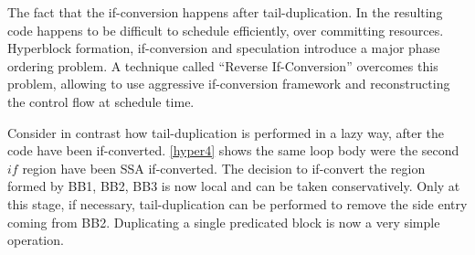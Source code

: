 \begin{figure}[h]
{    \label{fig:hyper2}}
\end{figure}
The fact that the if-conversion happens after tail-duplication. In the resulting code happens to be difficult to schedule efficiently, over committing resources. Hyperblock formation, if-conversion and speculation introduce a major phase ordering problem. A technique called ``Reverse If-Conversion'' \cite{August:1999:PRI:326224.325595} overcomes this problem, allowing to use aggressive if-conversion framework and reconstructing the control flow at schedule time.

Consider in contrast how tail-duplication is performed in a lazy way, after the code have been if-converted. \ref{hyper4} shows the same loop body were the second $if$ region have been SSA if-converted. The decision to if-convert the region formed by {BB1, BB2, BB3} is now local and can be taken conservatively. Only at this stage, if necessary, tail-duplication can be performed to remove the side entry coming from BB2. Duplicating a single predicated block is now a very simple operation.

